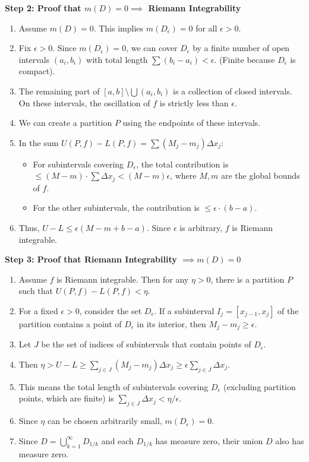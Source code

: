 \begin{solution}
\textbf{Step 2: Proof that $m(D)=0 \implies$ Riemann Integrability}
\begin{enumerate}
    \item Assume $m(D) = 0$. This implies $m(D_\epsilon) = 0$ for all $\epsilon > 0$.
    \item Fix $\epsilon > 0$. Since $m(D_\epsilon) = 0$, we can cover $D_\epsilon$ by a finite number of open intervals $(a_i, b_i)$ with total length $\sum (b_i - a_i) < \epsilon$. (Finite because $D_\epsilon$ is compact).
    \item The remaining part of $[a, b] \setminus \bigcup (a_i, b_i)$ is a collection of closed intervals. On these intervals, the oscillation of $f$ is strictly less than $\epsilon$.
    \item We can create a partition $P$ using the endpoints of these intervals.
    \item In the sum $U(P, f) - L(P, f) = \sum (M_j - m_j) \Delta x_j$:
       \begin{itemize}
           \item For subintervals covering $D_\epsilon$, the total contribution is $\leq (M - m) \cdot \sum \Delta x_j < (M - m)\epsilon$, where $M, m$ are the global bounds of $f$.
           \item For the other subintervals, the contribution is $\leq \epsilon \cdot (b - a)$.
       \end{itemize}
    \item Thus, $U - L \leq \epsilon(M - m + b - a)$. Since $\epsilon$ is arbitrary, $f$ is Riemann integrable.
\end{enumerate}

\textbf{Step 3: Proof that Riemann Integrability $\implies m(D)=0$}
\begin{enumerate}
    \item Assume $f$ is Riemann integrable. Then for any $\eta > 0$, there is a partition $P$ such that $U(P, f) - L(P, f) < \eta$.
    \item For a fixed $\epsilon > 0$, consider the set $D_\epsilon$. If a subinterval $I_j = [x_{j-1}, x_j]$ of the partition contains a point of $D_\epsilon$ in its interior, then $M_j - m_j \geq \epsilon$.
    \item Let $J$ be the set of indices of subintervals that contain points of $D_\epsilon$.
    \item Then $\eta > U - L \geq \sum_{j \in J} (M_j - m_j) \Delta x_j \geq \epsilon \sum_{j \in J} \Delta x_j$.
    \item This means the total length of subintervals covering $D_\epsilon$ (excluding partition points, which are finite) is $\sum_{j \in J} \Delta x_j < \eta / \epsilon$.
    \item Since $\eta$ can be chosen arbitrarily small, $m(D_\epsilon) = 0$.
    \item Since $D = \bigcup_{k=1}^\infty D_{1/k}$ and each $D_{1/k}$ has measure zero, their union $D$ also has measure zero.
\end{enumerate}
\end{solution}

